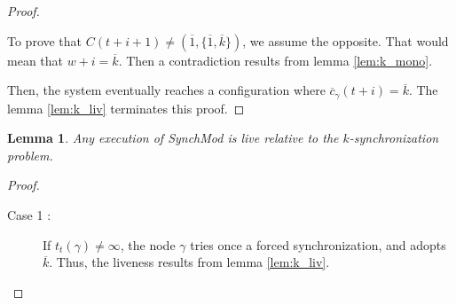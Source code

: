 \documentclass{article}
\newtheorem{lemma}{Lemma}[section]
\newcommand{\cent}{\gamma}
\newcommand{\try}{t_{t}}
\begin{document}
\begin{proof}
\begin{itemize}
			To prove that $C(t+i+1) \neq (\overline{1}, \{\overline{1}, \overline{k}\})$, we assume the opposite.
			That would mean that $w+i = \overline{k}$. Then a contradiction results from lemma \ref{lem:k_mono}.
	\end{itemize}
	Then, the system eventually reaches a configuration where $\overline{c}_\gamma(t+i) = \overline{k}$. The lemma \ref{lem:k_liv} terminates this proof.
\end{proof}

\begin{lemma}\label{lem:liv}
	Any execution of SynchMod is live relative to the $k$-synchronization problem.
\end{lemma}
\begin{proof}
	\begin{description}
		\item[Case 1 : ] If $\try(\cent) \neq \infty$, the node $\cent$ tries once a forced synchronization, and adopts $\overline{k}$.
			Thus, the liveness results from lemma \ref{lem:k_liv}.


\end{description}
\end{proof}
\end{document}
